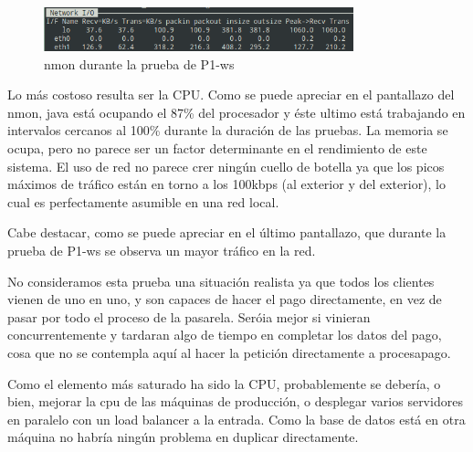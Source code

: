 \documentclass[a4paper, 10pt]{article}
\begin{document}
\begin{figure}[hbtp]
	 	\centering
	 	\includegraphics[width=0.8\textwidth]{../../p2/pantallazos/nmon_ej6.png}
	 	\caption{nmon durante la prueba de P1-ws}
\end{figure}

Lo más costoso resulta ser la CPU. Como se puede apreciar en el pantallazo del nmon, java está ocupando el 87\% del procesador y éste ultimo está trabajando en intervalos cercanos al 100\% durante la duración de las pruebas. La memoria se ocupa, pero no parece ser un factor determinante en el rendimiento de este sistema. El uso de red no parece crer ningún cuello de botella ya que los picos máximos de tráfico están en torno a los 100kbps (al exterior y del exterior), lo cual es perfectamente asumible en una red local.

Cabe destacar, como se puede apreciar en el último pantallazo, que durante la prueba de P1-ws se observa un mayor tráfico en la red.

No consideramos esta prueba una situación realista ya que todos los clientes vienen de uno en uno, y son capaces de hacer el pago directamente, en vez de pasar por todo el proceso de la pasarela. Seróia mejor si vinieran concurrentemente y tardaran algo de tiempo en completar los datos del pago, cosa que no se contempla aquí al hacer la petición directamente a procesapago.

Como el elemento más saturado ha sido la CPU, probablemente se debería, o bien, mejorar la cpu de las máquinas de producción, o desplegar varios servidores en paralelo con un load balancer a la entrada. Como la base de datos está en otra máquina no habría ningún problema en duplicar directamente.

\pagebreak
\end{document}
